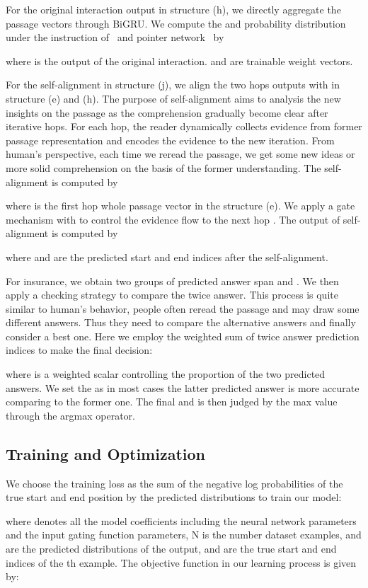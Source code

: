 \documentclass[letterpaper]{article} \usepackage{aaai18}  \usepackage{times}  \usepackage{helvet}  \usepackage{courier}  \usepackage{url}  \usepackage{graphicx}  \usepackage{booktabs}
\begin{document}
For the original interaction output in structure (h), we directly aggregate the passage vectors through BiGRU. We compute the  and  probability distribution under the instruction of~\cite{Wang2016Machine} and pointer network~\cite{Vinyals2015PointerN} by  

where  is the output of the original interaction.  and  are trainable weight vectors.  

For the self-alignment in structure (j), we align the two hops outputs  with  in structure (e) and (h). The purpose of self-alignment aims to analysis the new insights on the passage as the comprehension gradually become clear after iterative hops. For each hop, the reader dynamically collects evidence from former passage representation and encodes the evidence to the new iteration. From human's perspective, each time we reread the passage, we get some new ideas or more solid comprehension on the basis of the former understanding. The self-alignment is computed by
 
where  is the first hop whole passage vector in the structure (e). We apply a gate mechanism with  to control the evidence flow to the next hop . The output of self-alignment is computed by

 where  and  are the predicted start and end indices after the self-alignment.
 
 For insurance, we obtain two groups of predicted answer span  and . We then apply a checking strategy to compare the twice answer. This process is quite similar to human's behavior, people often reread the passage and may draw some different answers. Thus they need to compare the alternative answers and finally consider a best one. Here we employ the weighted sum of twice answer prediction indices to make the final decision:
  
 where  is a weighted scalar controlling the proportion of the two predicted answers. We set the  as in most cases the latter predicted answer is more accurate comparing to the former one. The final  and  is then judged by the max value through the argmax operator.  
 
\subsection{Training and Optimization}
We choose the training loss as the sum of the negative log probabilities of the true start and end position by the predicted distributions to train our model:

where  denotes all the model coefficients including the neural network parameters and the input gating function parameters, N is the number dataset examples,  and  are the predicted distributions of the output,  and  are the true start and end indices of the th example. The objective function in our learning process is given by:
\end{document}
